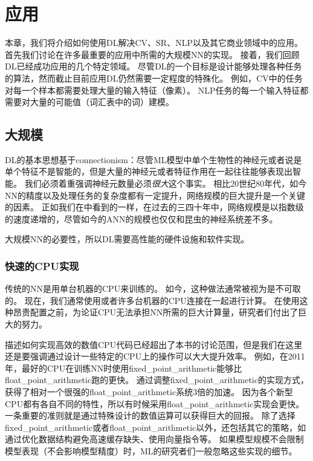 \chapter{应用}
\label{chap:applications}

本章，我们将介绍如何使用\gls{DL}解决\gls{CV}、\gls{SR}、\gls{NLP}以及其它商业领域中的应用。
首先我们讨论在许多最重要的应用中所需的大规模\gls{NN}的实现。
接着，我们回顾\gls{DL}已经成功应用的几个特定领域。
尽管\gls{DL}的一个目标是设计能够处理各种任务的算法，然而截止目前应用\gls{DL}仍然需要一定程度的特殊化。
例如，\gls{CV}中的任务对每一个样本都需要处理大量的输入特征（像素）。
\gls{NLP}任务的每一个输入特征都需要对大量的可能值（词汇表中的词）建模。

\section{大规模}
\label{sec:large_scale_deep_learning}

\gls{DL}的基本思想基于\gls{connectionism}：尽管\gls{ML}模型中单个生物性的神经元或者说是单个特征不是智能的，但是大量的神经元或者特征作用在一起往往能够表现出智能。
我们必须着重强调神经元数量必须\emph{很大}这个事实。
相比20世纪80年代，如今\gls{NN}的精度以及处理任务的复杂度都有一定提升，网络规模的巨大提升是一个关键的因素。
正如我们在中看到的一样，在过去的三四十年中，网络规模是以指数级的速度递增的，尽管如今的\gls{ANN}的规模也仅仅和昆虫的神经系统差不多。

大规模\gls{NN}的必要性，所以\gls{DL}需要高性能的硬件设施和软件实现。

\subsection{快速的CPU实现}
\label{sec:fast_cpu_implementations}

传统的\gls{NN}是用单台机器的CPU来训练的。
如今，这种做法通常被视为是不可取的。
现在，我们通常使用或者许多台机器的CPU连接在一起进行计算。
在使用这种昂贵配置之前，为论证CPU无法承担\gls{NN}所需的巨大计算量，研究者们付出了巨大的努力。


描述如何实现高效的数值CPU代码已经超出了本书的讨论范围，但是我们在这里还是要强调通过设计一些特定的CPU上的操作可以大大提升效率。
例如，在2011年，最好的CPU在训练\gls{NN}时使用\gls{fixed_point_arithmetic}能够比\gls{float_point_arithmetic}跑的更快。
通过调整\gls{fixed_point_arithmetic}的实现方式，\citet{Vanhoucke-et-al-2011}获得了相对一个很强的\gls{float_point_arithmetic}系统3倍的加速。
因为各个新型CPU都有各自不同的特性，所以有时候采用\gls{float_point_arithmetic}实现会更快。
一条重要的准则就是通过特殊设计的数值运算可以获得巨大的回报。
除了选择\gls{fixed_point_arithmetic}或者\gls{float_point_arithmetic}以外，还包括其它的策略，如通过优化数据结构避免高速缓存缺失、使用向量指令等。
如果模型规模不会限制模型表现（不会影响模型精度）时，\gls{ML}的研究者们一般忽略这些实现的细节。

